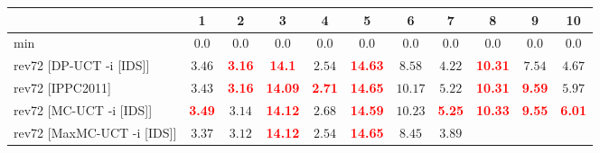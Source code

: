 \documentclass{article}
\begin{document}
\begin{tabular}{|l|r@{$\pm$}rr@{$\pm$}rr@{$\pm$}rr@{$\pm$}rr@{$\pm$}rr@{$\pm$}rr@{$\pm$}rr@{$\pm$}rr@{$\pm$}rr@{$\pm$}r|}
\hline

& \multicolumn{2}{c}{1}
& \multicolumn{2}{c}{2}
& \multicolumn{2}{c}{3}
& \multicolumn{2}{c}{4}
& \multicolumn{2}{c}{5}
& \multicolumn{2}{c}{6}
& \multicolumn{2}{c}{7}
& \multicolumn{2}{c}{8}
& \multicolumn{2}{c}{9}
& \multicolumn{2}{c|}{10}
\\
\hline
\hline
min
& \multicolumn{2}{c}{$0.0$}
& \multicolumn{2}{c}{$0.0$}
& \multicolumn{2}{c}{$0.0$}
& \multicolumn{2}{c}{$0.0$}
& \multicolumn{2}{c}{$0.0$}
& \multicolumn{2}{c}{$0.0$}
& \multicolumn{2}{c}{$0.0$}
& \multicolumn{2}{c}{$0.0$}
& \multicolumn{2}{c}{$0.0$}
& \multicolumn{2}{c|}{$0.0$}
\\
rev72 [DP-UCT -i [IDS]]
& \multicolumn{2}{c}{$3.46$}
& \multicolumn{2}{c}{\textbf{\textcolor{red}{3.16}}}
& \multicolumn{2}{c}{\textbf{\textcolor{red}{14.1}}}
& \multicolumn{2}{c}{$2.54$}
& \multicolumn{2}{c}{\textbf{\textcolor{red}{14.63}}}
& \multicolumn{2}{c}{$8.58$}
& \multicolumn{2}{c}{$4.22$}
& \multicolumn{2}{c}{\textbf{\textcolor{red}{10.31}}}
& \multicolumn{2}{c}{$7.54$}
& \multicolumn{2}{c|}{$4.67$}
\\
rev72 [IPPC2011]
& \multicolumn{2}{c}{$3.43$}
& \multicolumn{2}{c}{\textbf{\textcolor{red}{3.16}}}
& \multicolumn{2}{c}{\textbf{\textcolor{red}{14.09}}}
& \multicolumn{2}{c}{\textbf{\textcolor{red}{2.71}}}
& \multicolumn{2}{c}{\textbf{\textcolor{red}{14.65}}}
& \multicolumn{2}{c}{$10.17$}
& \multicolumn{2}{c}{$5.22$}
& \multicolumn{2}{c}{\textbf{\textcolor{red}{10.31}}}
& \multicolumn{2}{c}{\textbf{\textcolor{red}{9.59}}}
& \multicolumn{2}{c|}{$5.97$}
\\
rev72 [MC-UCT -i [IDS]]
& \multicolumn{2}{c}{\textbf{\textcolor{red}{3.49}}}
& \multicolumn{2}{c}{$3.14$}
& \multicolumn{2}{c}{\textbf{\textcolor{red}{14.12}}}
& \multicolumn{2}{c}{$2.68$}
& \multicolumn{2}{c}{\textbf{\textcolor{red}{14.59}}}
& \multicolumn{2}{c}{$10.23$}
& \multicolumn{2}{c}{\textbf{\textcolor{red}{5.25}}}
& \multicolumn{2}{c}{\textbf{\textcolor{red}{10.33}}}
& \multicolumn{2}{c}{\textbf{\textcolor{red}{9.55}}}
& \multicolumn{2}{c|}{\textbf{\textcolor{red}{6.01}}}
\\
rev72 [MaxMC-UCT -i [IDS]]
& \multicolumn{2}{c}{$3.37$}
& \multicolumn{2}{c}{$3.12$}
& \multicolumn{2}{c}{\textbf{\textcolor{red}{14.12}}}
& \multicolumn{2}{c}{$2.54$}
& \multicolumn{2}{c}{\textbf{\textcolor{red}{14.65}}}
& \multicolumn{2}{c}{$8.45$}
& \multicolumn{2}{c}{$3.89$}

\end{tabular}
\end{document}
